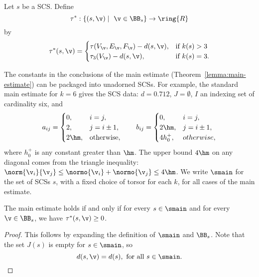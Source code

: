 \begin{definition}[$\tau^*$]\label{def:tau-star}
%
Let $s$ be a SCS.  Define 
\[
\tau^*:\{(s,\v)\mid \ \v\in \BB_s\} \to \ring{R}
\] 
by
\[ 
\tau^*(s,\v) = \begin{cases}
  \tau(V_\v,E_\v,F_\v)-d(s,\v),  &\text{if } k(s) > 3\\
  \tau_3(V_\v)-d(s,\v), &\text{if } k(s) = 3.
\end{cases}
\] 
%
\end{definition}



\begin{definition}[$\smain$]\label{ex:main} 
The constants in the conclusions of the main estimate
  (Theorem~\ref{lemma:main-estimate}) can be packaged into unadorned SCSs.  
For example, the standard main estimate for $k=6$ gives
  the SCS data: $d=0.712$, $J=\emptyset$, $I$ an indexing set
  of cardinality six, and
\[
a_{ij} = \begin{cases} 0, & i=j,\\
  2, & j= i\pm1,\\
  2 \hm, & \text{otherwise},
  \end{cases}
\qquad
b_{ij}=\begin{cases}
 0, & i=j,\\
 2\hm, & j= i\pm1,\\
 4h_0^+, & otherwise,
  \end{cases}
\]
where $h_0^+$ is any constant greater than $\hm$.
The upper bound $4\hm$ on any diagonal comes from the triangle
inequality: $\norm{\v_i}{\v_j} \le \normo{\v_i}+\normo{\v_j} \le
4\hm$.   
We write $\smain$ for the set of SCSs $s$, with a
fixed choice of torsor for each $k$, for all cases of the main
estimate.
\end{definition}
%


\begin{lemma}\label{lemma:main-smain}  
The main estimate holds if and only if for every
$s\in\smain$ and for every $\v\in \BB_s$, we have $\tau^*(s,\v)\ge0$.
\end{lemma}

\begin{proof}  This follows by expanding the definition of $\smain$ and $\BB_s$.
Note that
the set $J(s)$ is empty for $s\in \smain$, so 
\[
d(s,\v) = d(s), \text{ for all } s \in \smain.
\]
\end{proof}



